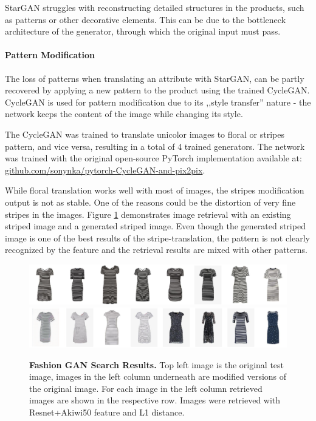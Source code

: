 \documentclass[12pt]{report}
\begin{document}
StarGAN struggles with reconstructing detailed structures in the products, such as patterns or other decorative elements. This can be due to the bottleneck architecture of the generator, through which the original input must pass. 

\paragraph{Pattern Modification}
The loss of patterns when translating an attribute with StarGAN, can be partly recovered by applying a new pattern to the product using the trained CycleGAN. CycleGAN is used for pattern modification due to its ,,style transfer'' nature - the network keeps the content of the image while changing its style.

The CycleGAN was trained to translate unicolor images to floral or stripes pattern, and vice versa, resulting in a total of 4 trained generators. The network was trained with the original open-source PyTorch implementation available at: \linebreak \hyperlink{https://github.com/sonynka/pytorch-CycleGAN-and-pix2pix}{github.com/sonynka/pytorch-CycleGAN-and-pix2pix}. 

While floral translation works well with most of images, the stripes modification output is not as stable. One of the reasons could be the distortion of very fine stripes in the images.  Figure \ref{fig:stripes_retrieval} demonstrates image retrieval with an existing striped image and a generated striped image. Even though the generated striped image is one of the best results of the stripe-translation, the pattern is not clearly recognized by the feature and the retrieval results are mixed with other patterns.

\begin{figure}[h]
\centering
{\includegraphics[width=\linewidth]{05_results/stripes_orig_results}}
{\includegraphics[width=\linewidth]{05_results/stripes_gen_results}}
\caption{\label{fig:stripes_retrieval} \textbf{Fashion GAN Search Results.} Top left image is the original test image, images in the left column underneath are modified versions of the original image. For each image in the left column retrieved images are shown in the respective row. Images were retrieved with Resnet+Akiwi50 feature and L1 distance.}
\end{figure}
\end{document}
